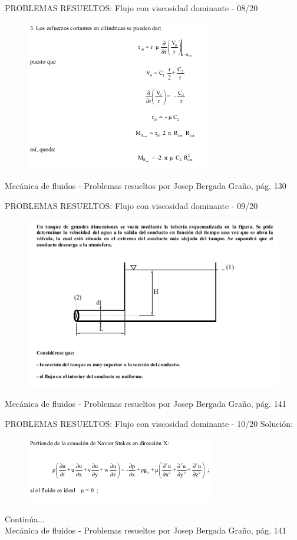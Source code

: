 \begin{frame}{PROBLEMAS RESUELTOS: Flujo con viscosidad dominante - 08/20}
\justifying
\begin{figure}[H]
\centering
\includegraphics[scale=0.5]{Section_Files/S2-imagenes-Jhon/Book-ProbResuelts/P35-E08.png}
\end{figure}
{\tiny Mecánica de fluidos - Problemas resueltos por Josep Bergada Graño, pág. 130}
\end{frame}

\begin{frame}{PROBLEMAS RESUELTOS: Flujo con viscosidad dominante - 09/20}
\justifying
\begin{figure}[H]
\centering
\includegraphics[scale=0.5]{Section_Files/S2-imagenes-Jhon/Book-ProbResuelts/P38-E01.png}
\end{figure}
{\tiny Mecánica de fluidos - Problemas resueltos por Josep Bergada Graño, pág. 141}
\end{frame}

\begin{frame}{PROBLEMAS RESUELTOS: Flujo con viscosidad dominante - 10/20}
\justifying
Solución:
\begin{figure}[H]
\centering
\includegraphics[scale=0.5]{Section_Files/S2-imagenes-Jhon/Book-ProbResuelts/P38-E02.png}
\end{figure}
Continúa...\\
{\tiny Mecánica de fluidos - Problemas resueltos por Josep Bergada Graño, pág. 141}
\end{frame}

